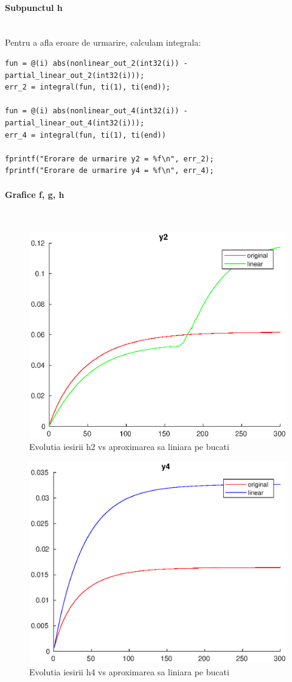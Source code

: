 \documentclass[12pt,english]{article}
\newcommand{\myparagraph}[1]{\paragraph{#1}\mbox{}\\}
\begin{document}
\myparagraph {Subpunctul h}
Pentru a afla eroare de urmarire, calculam integrala:

\begin{verbatim}
fun = @(i) abs(nonlinear_out_2(int32(i)) - partial_linear_out_2(int32(i)));
err_2 = integral(fun, ti(1), ti(end));

fun = @(i) abs(nonlinear_out_4(int32(i)) - partial_linear_out_4(int32(i)));
err_4 = integral(fun, ti(1), ti(end))

fprintf("Erorare de urmarire y2 = %f\n", err_2);
fprintf("Erorare de urmarire y4 = %f\n", err_4);
\end{verbatim}

\myparagraph {Grafice f, g, h}

\begin{figure} [H]
	\includegraphics[width=1\textwidth]{fgh_1.eps}
	\caption{Evolutia iesirii h2 vs aproximarea sa liniara pe bucati}
\end{figure}

\begin{figure} [H]
	\includegraphics[width=1\textwidth]{fgh_2.eps}
	\caption{Evolutia iesirii h4 vs aproximarea sa liniara pe bucati}
\end{figure}
\end{document}
